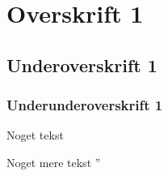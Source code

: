 \section{Overskrift 1}

\subsection{Underoverskrift 1}

\subsubsection{Underunderoverskrift 1}

Noget tekst

Noget mere tekst
''
